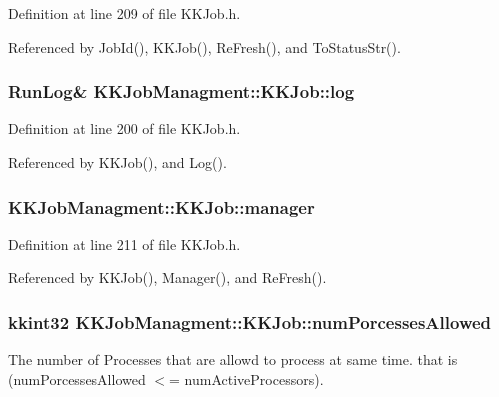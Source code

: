 Definition at line 209 of file K\+K\+Job.\+h.



Referenced by Job\+Id(), K\+K\+Job(), Re\+Fresh(), and To\+Status\+Str().

\subsubsection[{\texorpdfstring{log}{log}}]{\setlength{\rightskip}{0pt plus 5cm}Run\+Log\& K\+K\+Job\+Managment\+::\+K\+K\+Job\+::log}\hypertarget{class_k_k_job_managment_1_1_k_k_job_ad2466a68d9a01778e0f08af0478b94e5}{}\label{class_k_k_job_managment_1_1_k_k_job_ad2466a68d9a01778e0f08af0478b94e5}


Definition at line 200 of file K\+K\+Job.\+h.



Referenced by K\+K\+Job(), and Log().

\subsubsection[{\texorpdfstring{manager}{manager}}]{ K\+K\+Job\+Managment\+::\+K\+K\+Job\+::manager\hspace{0.3cm}{\ttfamily [protected]}}\hypertarget{class_k_k_job_managment_1_1_k_k_job_a8924654ec92375dd89d6b60afb427c16}{}\label{class_k_k_job_managment_1_1_k_k_job_a8924654ec92375dd89d6b60afb427c16}


Definition at line 211 of file K\+K\+Job.\+h.



Referenced by K\+K\+Job(), Manager(), and Re\+Fresh().

\subsubsection[{\texorpdfstring{num\+Porcesses\+Allowed}{numPorcessesAllowed}}]{\setlength{\rightskip}{0pt plus 5cm}kkint32 K\+K\+Job\+Managment\+::\+K\+K\+Job\+::num\+Porcesses\+Allowed\hspace{0.3cm}{\ttfamily [protected]}}\hypertarget{class_k_k_job_managment_1_1_k_k_job_aac8edcaac05b4e6f9511a3f1dff7e0a8}{}\label{class_k_k_job_managment_1_1_k_k_job_aac8edcaac05b4e6f9511a3f1dff7e0a8}
The number of Processes that are allowd to process at same time. that is (\textquotesingle{}num\+Porcesses\+Allowed\textquotesingle{} $<$= \textquotesingle{}num\+Active\+Processors\textquotesingle{}). 

